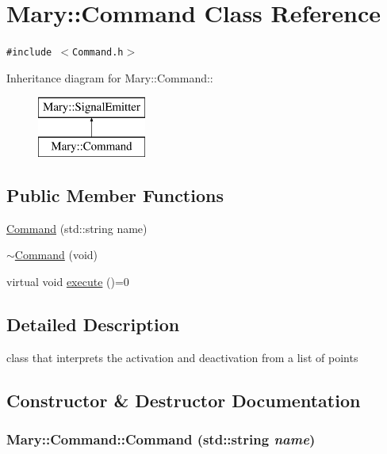 \hypertarget{class_mary_1_1_command}{
\section{Mary::Command Class Reference}
\label{class_mary_1_1_command}
}
{\tt \#include $<$Command.h$>$}

Inheritance diagram for Mary::Command::\begin{figure}[H]
\begin{center}
\leavevmode
\includegraphics[height=2cm]{class_mary_1_1_command}
\end{center}
\end{figure}
\subsection*{Public Member Functions}
\begin{CompactItemize}
\item 
\hyperlink{class_mary_1_1_command_dd87589642d6dab534d464d4b337b30e}{Command} (std::string name)
\item 
\hyperlink{class_mary_1_1_command_071172304126f8e6e7f74bff0c3dbbe4}{$\sim$Command} (void)
\item 
virtual void \hyperlink{class_mary_1_1_command_728ec9aacd0254361f7962b0b032ec55}{execute} ()=0
\end{CompactItemize}


\subsection{Detailed Description}
class that interprets the activation and deactivation from a list of points 

\subsection{Constructor \& Destructor Documentation}
\hypertarget{class_mary_1_1_command_dd87589642d6dab534d464d4b337b30e}{
\subsubsection[Command]{\setlength{\rightskip}{0pt plus 5cm}Mary::Command::Command (std::string {\em name})}}
\label{class_mary_1_1_command_dd87589642d6dab534d464d4b337b30e}



